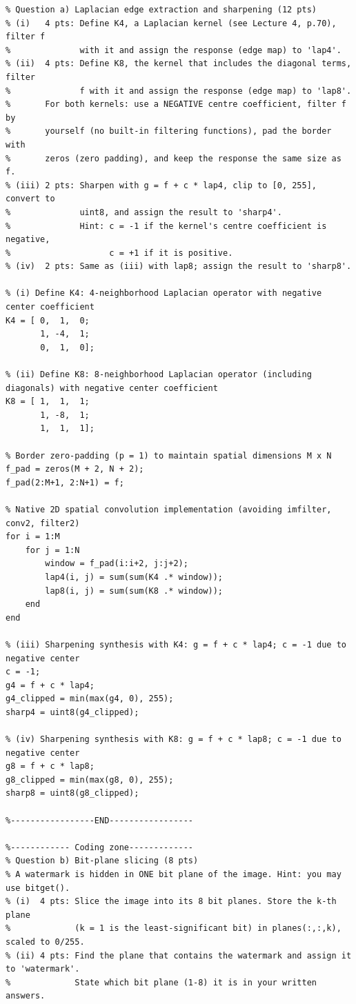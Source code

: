 \documentclass[11pt,a4paper]{article}
\begin{document}
\begin{lstlisting}[caption={Complete and unabridged implementation of \texttt{problem6.m}.}]
%------------ Coding zone-------------
% Question a) Laplacian edge extraction and sharpening (12 pts)
% (i)   4 pts: Define K4, a Laplacian kernel (see Lecture 4, p.70), filter f
%              with it and assign the response (edge map) to 'lap4'.
% (ii)  4 pts: Define K8, the kernel that includes the diagonal terms, filter
%              f with it and assign the response (edge map) to 'lap8'.
%       For both kernels: use a NEGATIVE centre coefficient, filter f by
%       yourself (no built-in filtering functions), pad the border with
%       zeros (zero padding), and keep the response the same size as f.
% (iii) 2 pts: Sharpen with g = f + c * lap4, clip to [0, 255], convert to
%              uint8, and assign the result to 'sharp4'.
%              Hint: c = -1 if the kernel's centre coefficient is negative,
%                    c = +1 if it is positive.
% (iv)  2 pts: Same as (iii) with lap8; assign the result to 'sharp8'.

% (i) Define K4: 4-neighborhood Laplacian operator with negative center coefficient
K4 = [ 0,  1,  0;
       1, -4,  1;
       0,  1,  0];

% (ii) Define K8: 8-neighborhood Laplacian operator (including diagonals) with negative center coefficient
K8 = [ 1,  1,  1;
       1, -8,  1;
       1,  1,  1];

% Border zero-padding (p = 1) to maintain spatial dimensions M x N
f_pad = zeros(M + 2, N + 2);
f_pad(2:M+1, 2:N+1) = f;

% Native 2D spatial convolution implementation (avoiding imfilter, conv2, filter2)
for i = 1:M
    for j = 1:N
        window = f_pad(i:i+2, j:j+2);
        lap4(i, j) = sum(sum(K4 .* window));
        lap8(i, j) = sum(sum(K8 .* window));
    end
end

% (iii) Sharpening synthesis with K4: g = f + c * lap4; c = -1 due to negative center
c = -1;
g4 = f + c * lap4;
g4_clipped = min(max(g4, 0), 255);
sharp4 = uint8(g4_clipped);

% (iv) Sharpening synthesis with K8: g = f + c * lap8; c = -1 due to negative center
g8 = f + c * lap8;
g8_clipped = min(max(g8, 0), 255);
sharp8 = uint8(g8_clipped);

%-----------------END-----------------

%------------ Coding zone-------------
% Question b) Bit-plane slicing (8 pts)
% A watermark is hidden in ONE bit plane of the image. Hint: you may use bitget().
% (i)  4 pts: Slice the image into its 8 bit planes. Store the k-th plane
%             (k = 1 is the least-significant bit) in planes(:,:,k), scaled to 0/255.
% (ii) 4 pts: Find the plane that contains the watermark and assign it to 'watermark'.
%             State which bit plane (1-8) it is in your written answers.


\end{lstlisting}
\end{document}
